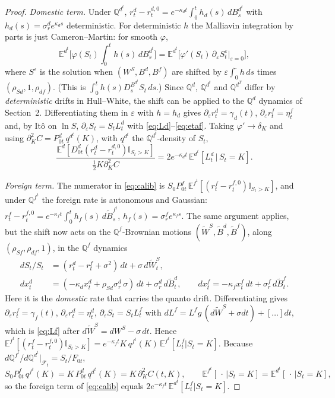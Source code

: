 \documentclass[11pt,a4paper]{article}
\theoremstyle{plain}
\theoremstyle{remark}
\newcommand{\E}{\mathbb{E}}
\newcommand{\Q}{\mathbb{Q}}
\newcommand{\I}{\mathbb{I}}
\newcommand{\sgd}{\sigma^d_r}
\newcommand{\sgf}{\sigma^f_r}
\newcommand{\Ld}{L^{d}}
\newcommand{\Lf}{L^{f}}
\begin{document}
\begin{proof}
\emph{Domestic term.} Under $\Q^{d^t}$,
$r^d_t-r^{d,0}_t=e^{-\kappa_dt}\int_0^th_d(s)\,dB^{d^t}_s$ with
$h_d(s)=\sgd e^{\kappa_ds}$ deterministic. For deterministic $h$ the Malliavin
integration by parts is just Cameron--Martin: for smooth $\varphi$,
\[
\E^{d^t}\Big[\varphi(S_t)\int_0^th(s)\,dB^{d^t}_s\Big]
=\E^{d^t}\big[\varphi'(S_t)\,\partial_\varepsilon S^\varepsilon_t\big|_{\varepsilon=0}\big],
\]
where $S^\varepsilon$ is the solution when $(W^S,B^d,B^f)$ are shifted by
$\varepsilon\int_0^\cdot h\,ds$ times $(\rho_{Sd},1,\rho_{df})$. (This is
$\int_0^th(s)D_s^{B^{d^t}}S_t\,ds$.) Since $\Q^d$, $\Q^{d^t}$ and $\Q^{d^T}$
differ by \emph{deterministic} drifts in Hull--White, the shift can be applied
to the $\Q^d$ dynamics of Section~2. Differentiating them in $\varepsilon$ with
$h=h_d$ gives $\partial_\varepsilon r^d_t=\gamma_d(t)$,
$\partial_\varepsilon r^f_t=\eta^f_t$ and, by It\^o on $\ln S$,
$\partial_\varepsilon S_t=S_t\Ld_t$ with \eqref{eq:Ld}--\eqref{eq:etaf}. Taking
$\varphi'\to\delta_K$ and using
$\partial_K^2C=P^d_{0t}\,q^{d^t}(K)$, with $q^{d^t}$ the $\Q^{d^t}$-density of
$S_t$,
\[
\frac{\E^d[D^d_{0t}(r^d_t-r^{d,0}_t)\I_{S_t>K}]}{\tfrac12K\partial^2_KC}
=2e^{-\kappa_dt}\,\E^{d^t}[\Ld_t\,|\,S_t=K].
\]

\emph{Foreign term.} The numerator in \eqref{eq:calib} is
$S_0P^f_{0t}\,\E^{f^t}[(r^f_t-r^{f,0}_t)\I_{S_t>K}]$, and under $\Q^{f^t}$ the
foreign rate is autonomous and Gaussian:
$r^f_t-r^{f,0}_t=e^{-\kappa_ft}\int_0^th_f(s)\,d\widetilde B^{f^t}_s$,
$h_f(s)=\sgf e^{\kappa_fs}$. The same argument applies, but the shift now acts on
the $\Q^f$-Brownian motions $(\widetilde W^S,\widetilde B^d,\widetilde B^f)$,
along $(\rho_{Sf},\rho_{df},1)$, in the $\Q^f$ dynamics
\begin{align*}
dS_t/S_t&=(r^d_t-r^f_t+\sigma^2)\,dt+\sigma\,d\widetilde W^S_t, \\
dx^d_t&=(-\kappa_dx^d_t+\rho_{Sd}\sgd\,\sigma)\,dt+\sgd\,d\widetilde B^d_t, \qquad
dx^f_t=-\kappa_fx^f_t\,dt+\sgf\,d\widetilde B^f_t .
\end{align*}
Here it is the \emph{domestic} rate that carries the quanto drift.
Differentiating gives $\partial_\varepsilon r^f_t=\gamma_f(t)$,
$\partial_\varepsilon r^d_t=\eta^d_t$, $\partial_\varepsilon S_t=S_t\Lf_t$ with
$d\Lf=\Lf g\,(d\widetilde W^S+\sigma dt)+[\ldots]dt$, which is \eqref{eq:Lf}
after $d\widetilde W^S=dW^S-\sigma\,dt$. Hence
$\E^{f^t}[(r^f_t-r^{f,0}_t)\I_{S_t>K}]=e^{-\kappa_ft}K\,q^{f^t}(K)\,\E^{f^t}[\Lf_t|S_t=K]$.
Because $d\Q^{f^t}/d\Q^{d^t}|_{\mathcal F_t}=S_t/F_{0t}$,
\[
S_0P^f_{0t}\,q^{f^t}(K)=K\,P^d_{0t}\,q^{d^t}(K)=K\,\partial_K^2C(t,K),
\qquad
\E^{f^t}[\,\cdot\,|S_t=K]=\E^{d^t}[\,\cdot\,|S_t=K],
\]
so the foreign term of \eqref{eq:calib} equals
$2e^{-\kappa_ft}\,\E^{d^t}[\Lf_t|S_t=K]$.
\end{proof}
\end{document}
